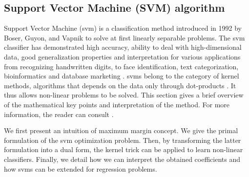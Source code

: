 \subsection{Support Vector Machine (SVM) algorithm}
\label{sec:svm}

Support Vector Machine ({\sc svm}) is a classification method introduced in 1992 by Boser, Guyon, and Vapnik \cite{Boser1992,Cortes1995} to solve at first linearly separable problems. The {\sc svm} classifier has demonstrated high accuracy, ability to deal with high-dimensional data, good generalization properties and interpretation for various applications from recognizing handwritten digits, to face identification, text categorization, bioinformatics and database marketing \cite{Wang2002,Yang1999,Heisele2001,Sadri2003,Campbell2011}. {\sc svm}s belong to the category of kernel methods, algorithms that depends on the data only through dot-products \cite{Schlkopf2013}. It thus allows non-linear problems to be solved. This section gives a brief overview of the mathematical key points and interpretation of the method. For more information, the reader can consult \cite{Schlkopf2013,Campbell2011,Cortes1995}.

We first present an intuition of maximum margin concept. We give the primal formulation of the {\sc svm} optimization problem. Then, by transforming the latter formulation into a dual form, the kernel trick can be applied to learn non-linear classifiers. Finally, we detail how we can interpret the obtained coefficients and how {\sc svm}s can be extended for regression problems.



